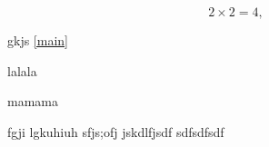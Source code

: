\documentclass[12pt,a4paper]{report}
\begin{document}





\begin{equation}
2\times 2=4,\label{main}
\end{equation}

gkjs \ref{main}


\begin{sqlist}
\item lalala
\item mamama
\end{sqlist}

fgji \citep{ER89} lgkuhiuh \citep{Adakudlu12} 
sfjs;ofj
jskdlfjsdf
sdfsdfsdf \citep{dierer2005}


\end{document}
